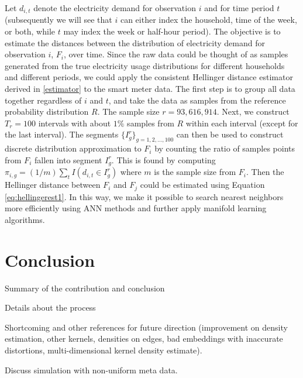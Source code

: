 \documentclass[11pt,a4paper,]{article}
\begin{document}
Let \(d_{i,t}\) denote the electricity demand for observation \(i\) and for time period \(t\) (subsequently we will see that \(i\) can either index the household, time of the week, or both, while \(t\) may index the week or half-hour period). The objective is to estimate the distances between the distribution of electricity demand for observation \(i\), \(F_i\), over time. Since the raw data could be thought of as samples generated from the true electricity usage distributions for different households and different periods, we could apply the consistent Hellinger distance estimator derived in \autoref{estimator} to the smart meter data.
The first step is to group all data together regardless of \(i\) and \(t\), and take the data as samples from the reference probability distribution \(R\). The sample size \(r=93,616,914\). Next, we construct \(T_r=100\) intervals with about \(1\%\) samples from \(R\) within each interval (except for the last interval). The segments \(\{I_g^r\}_{g=1,2,\dots,100}\) can then be used to construct discrete distribution approximation to \(F_i\) by counting the ratio of samples points from \(F_i\) fallen into segment \(I_g^r\).
This is found by computing \(\pi_{i,g}=(1/m)\sum_t I(d_{i,t} \in I_g^r)\) where \(m\) is the sample size from \(F_i\).
Then the Hellinger distance between \(F_i\) and \(F_j\) could be estimated using Equation \eqref{eq:hellingerest1}.
In this way, we make it possible to search nearest neighbors more efficiently using ANN methods and further apply manifold learning algorithms.

\hypertarget{conclusion}{%
\section{Conclusion}\label{conclusion}}

Summary of the contribution and conclusion

Details about the process

Shortcoming and other references for future direction (improvement on density estimation, other kernels, densities on edges, bad embeddings with inaccurate distortions, multi-dimensional kernel density estimate).

Discuss simulation with non-uniform meta data.

\printbibliography
\end{document}
